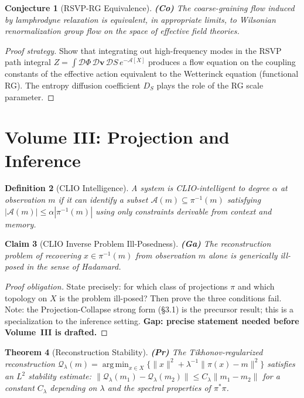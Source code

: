 \documentclass[11pt, a4paper]{book}
\theoremstyle{flyxion}
\newtheorem{theorem}{Theorem}[chapter]
\newtheorem{conjecture}[theorem]{Conjecture}
\newtheorem{definition}[theorem]{Definition}
\newtheorem{claim}[theorem]{Claim}
\theoremstyle{remark}
\begin{document}
\begin{conjecture}[RSVP-RG Equivalence] \textbf{(Co)}
The coarse-graining flow induced by lamphrodyne relaxation is
equivalent, in appropriate limits, to Wilsonian renormalization
group flow on the space of effective field theories.
\end{conjecture}
\begin{proof}[Proof strategy]
Show that integrating out high-frequency modes in the RSVP path
integral $Z = \int \mathcal{D}\Phi\,\mathcal{D}\mathbf{v}\,\mathcal{D}S
\, e^{-\mathcal{A}[X]}$ produces a flow equation on the coupling
constants of the effective action equivalent to the Wetterinck
equation (functional RG). The entropy diffusion coefficient $D_S$
plays the role of the RG scale parameter.
\end{proof}

\section{Volume III: Projection and Inference}

\begin{definition}[CLIO Intelligence]
A system is \emph{CLIO-intelligent} to degree $\alpha$ at
observation $m$ if it can identify a subset
$\mathcal{A}(m) \subseteq \pi^{-1}(m)$ satisfying
$|\mathcal{A}(m)| \leq \alpha |\pi^{-1}(m)|$
using only constraints derivable from context and memory.
\end{definition}

\begin{claim}[CLIO Inverse Problem Ill-Posedness] \textbf{(Ga)}
The reconstruction problem of recovering $x \in \pi^{-1}(m)$ from
observation $m$ alone is generically ill-posed in the sense of Hadamard.
\end{claim}
\begin{proof}[Proof obligation]
State precisely: for which class of projections $\pi$ and which
topology on $X$ is the problem ill-posed? Then prove the three
conditions fail. Note: the Projection-Collapse strong form (§3.1)
is the precursor result; this is a specialization to the inference
setting. \textbf{Gap: precise statement needed before Volume~III
is drafted.}
\end{proof}

\begin{theorem}[Reconstruction Stability] \textbf{(Pr)}
The Tikhonov-regularized reconstruction $\mathcal{Q}_\lambda(m) =
\operatorname{arg\,min}_{x \in X}\{\|x\|^2 + \lambda^{-1}
\|\pi(x) - m\|^2\}$ satisfies an $L^2$ stability estimate:
$\|\mathcal{Q}_\lambda(m_1) - \mathcal{Q}_\lambda(m_2)\|
\leq C_\lambda\|m_1 - m_2\|$ for a constant $C_\lambda$ depending on
$\lambda$ and the spectral properties of $\pi^*\pi$.
\end{theorem}
\end{document}
